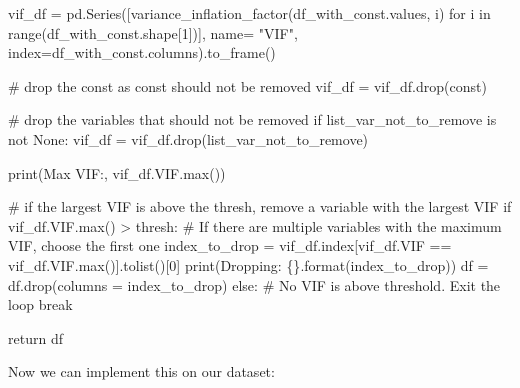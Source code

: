 \documentclass[
  letterpaper,
  DIV=11,
  numbers=noendperiod]{scrreprt}
\newenvironment{Shaded}{\begin{snugshade}}{\end{snugshade}}
\newcommand{\BuiltInTok}[1]{\textcolor[rgb]{0.00,0.23,0.31}{#1}}
\newcommand{\CommentTok}[1]{\textcolor[rgb]{0.37,0.37,0.37}{#1}}
\newcommand{\ControlFlowTok}[1]{\textcolor[rgb]{0.00,0.23,0.31}{#1}}
\newcommand{\DecValTok}[1]{\textcolor[rgb]{0.68,0.00,0.00}{#1}}
\newcommand{\KeywordTok}[1]{\textcolor[rgb]{0.00,0.23,0.31}{#1}}
\newcommand{\NormalTok}[1]{\textcolor[rgb]{0.00,0.23,0.31}{#1}}
\newcommand{\OperatorTok}[1]{\textcolor[rgb]{0.37,0.37,0.37}{#1}}
\newcommand{\SpecialCharTok}[1]{\textcolor[rgb]{0.37,0.37,0.37}{#1}}
\newcommand{\StringTok}[1]{\textcolor[rgb]{0.13,0.47,0.30}{#1}}
\newcommand{\VariableTok}[1]{\textcolor[rgb]{0.07,0.07,0.07}{#1}}
\begin{document}
\begin{Shaded}
\begin{Highlighting}[]
\NormalTok{        vif\_df }\OperatorTok{=}\NormalTok{ pd.Series([variance\_inflation\_factor(df\_with\_const.values, i) }
               \ControlFlowTok{for}\NormalTok{ i }\KeywordTok{in} \BuiltInTok{range}\NormalTok{(df\_with\_const.shape[}\DecValTok{1}\NormalTok{])], name}\OperatorTok{=} \StringTok{"VIF"}\NormalTok{,}
\NormalTok{              index}\OperatorTok{=}\NormalTok{df\_with\_const.columns).to\_frame()}

        \CommentTok{\# drop the const as const should not be removed}
\NormalTok{        vif\_df }\OperatorTok{=}\NormalTok{ vif\_df.drop(}\StringTok{\textquotesingle{}const\textquotesingle{}}\NormalTok{)}
        
        \CommentTok{\# drop the variables that should not be removed}
        \ControlFlowTok{if}\NormalTok{ list\_var\_not\_to\_remove }\KeywordTok{is} \KeywordTok{not} \VariableTok{None}\NormalTok{:}
\NormalTok{            vif\_df }\OperatorTok{=}\NormalTok{ vif\_df.drop(list\_var\_not\_to\_remove)}
            
        \BuiltInTok{print}\NormalTok{(}\StringTok{\textquotesingle{}Max VIF:\textquotesingle{}}\NormalTok{, vif\_df.VIF.}\BuiltInTok{max}\NormalTok{())}
        
        \CommentTok{\# if the largest VIF is above the thresh, remove a variable with the largest VIF}
        \ControlFlowTok{if}\NormalTok{ vif\_df.VIF.}\BuiltInTok{max}\NormalTok{() }\OperatorTok{\textgreater{}}\NormalTok{ thresh:}
            \CommentTok{\# If there are multiple variables with the maximum VIF, choose the first one}
\NormalTok{            index\_to\_drop }\OperatorTok{=}\NormalTok{ vif\_df.index[vif\_df.VIF }\OperatorTok{==}\NormalTok{ vif\_df.VIF.}\BuiltInTok{max}\NormalTok{()].tolist()[}\DecValTok{0}\NormalTok{]}
            \BuiltInTok{print}\NormalTok{(}\StringTok{\textquotesingle{}Dropping: }\SpecialCharTok{\{\}}\StringTok{\textquotesingle{}}\NormalTok{.}\BuiltInTok{format}\NormalTok{(index\_to\_drop))}
\NormalTok{            df }\OperatorTok{=}\NormalTok{ df.drop(columns }\OperatorTok{=}\NormalTok{ index\_to\_drop)}
        \ControlFlowTok{else}\NormalTok{:}
            \CommentTok{\# No VIF is above threshold. Exit the loop}
            \ControlFlowTok{break}

    \ControlFlowTok{return}\NormalTok{ df}
\end{Highlighting}
\end{Shaded}

Now we can implement this on our dataset:
\end{document}
